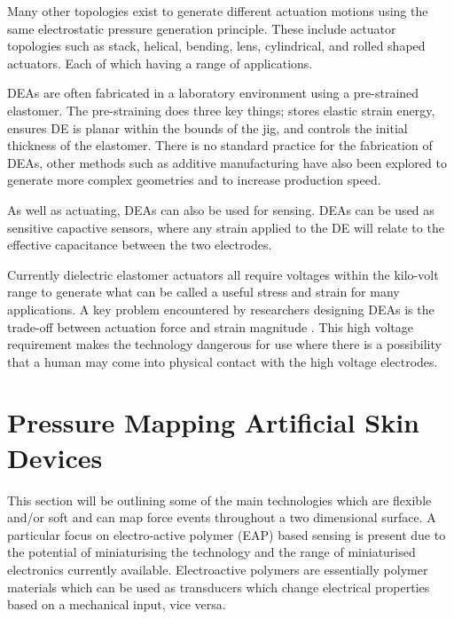 Many other topologies exist to generate different actuation motions using the same electrostatic pressure generation principle. These include actuator topologies such as stack\citep{Hau2018,Kovacs2009}, helical\citep{Carpi2012}, bending\citep{Pfeil2020}, lens\citep{Ghilardi2019}, cylindrical, and rolled shaped actuators\citep{Amin2018}. Each of which having a range of applications.

DEAs are often fabricated in a laboratory environment using a pre-strained elastomer. The pre-straining does three key things; stores elastic strain energy, ensures DE is planar within the bounds of the jig, and controls the initial thickness of the elastomer. There is no standard practice for the fabrication of DEAs, other methods such as additive manufacturing have also been explored to generate more complex geometries and to increase production speed\citep{Park2018,McCoul2017}.

As well as actuating, DEAs can also be used for sensing. DEAs can be used as sensitive capactive sensors, where any strain applied to the DE will relate to the effective capacitance between the two electrodes\citep{Jung2008,Goulbourne2007,Gisby2013}. 

Currently dielectric elastomer actuators all require voltages within the kilo-volt range to generate what can be called a useful stress and strain for many applications. A key problem encountered by researchers designing DEAs is the trade-off between actuation force and strain magnitude \citep{Hau2018}. This high voltage requirement makes the technology dangerous for use where there is a possibility that a human may come into physical contact with the high voltage electrodes.



\section{Pressure Mapping Artificial Skin Devices}
This section will be outlining some of the main technologies which are flexible and/or soft and can map force events throughout a two dimensional surface. A particular focus on electro-active polymer (EAP) based sensing is present due to the potential of miniaturising the technology and the range of miniaturised electronics currently available. Electroactive polymers are essentially polymer materials which can be used as transducers which change electrical properties based on a mechanical input, vice versa.


